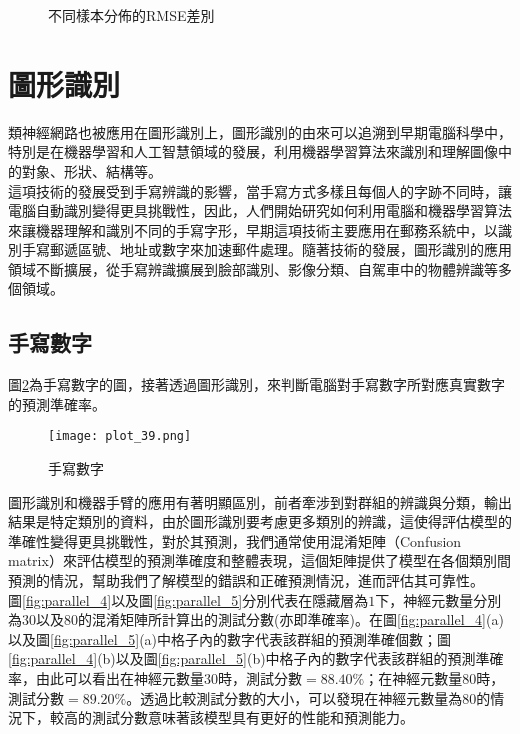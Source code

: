 \documentclass[12pt, a4paper]{article}
\begin{document}
\begin{figure}[H]
\centering
{}
\caption{不同樣本分佈的RMSE差別}
\label{fig:parallel_9}
\end{figure}

\section{圖形識別}
類神經網路也被應用在圖形識別上，圖形識別的由來可以追溯到早期電腦科學中，特別是在機器學習和人工智慧領域的發展，利用機器學習算法來識別和理解圖像中的對象、形狀、結構等。\\
這項技術的發展受到手寫辨識的影響，當手寫方式多樣且每個人的字跡不同時，讓電腦自動識別變得更具挑戰性，因此，人們開始研究如何利用電腦和機器學習算法來讓機器理解和識別不同的手寫字形，早期這項技術主要應用在郵務系統中，以識別手寫郵遞區號、地址或數字來加速郵件處理。隨著技術的發展，圖形識別的應用領域不斷擴展，從手寫辨識擴展到臉部識別、影像分類、自駕車中的物體辨識等多個領域。
\subsection{手寫數字}
圖\;\ref{fig:plot_39.png}\;為手寫數字的圖，接著透過圖形識別，來判斷電腦對手寫數字所對應真實數字的預測準確率。

\begin{figure}[H]
\centering
\texttt{[image: plot\_39.png]}
\caption{手寫數字}
\label{fig:plot_39.png}
\end{figure}


圖形識別和機器手臂的應用有著明顯區別，前者牽涉到對群組的辨識與分類，輸出結果是特定類別的資料，由於圖形識別要考慮更多類別的辨識，這使得評估模型的準確性變得更具挑戰性，對於其預測，我們通常使用混淆矩陣（Confusion matrix）來評估模型的預測準確度和整體表現，這個矩陣提供了模型在各個類別間預測的情況，幫助我們了解模型的錯誤和正確預測情況，進而評估其可靠性。\\
圖\;\ref{fig:parallel_4}\;以及圖\;\ref{fig:parallel_5}\;分別代表在隱藏層為\;$1$\;下，神經元數量分別為\;$30$\;以及\;$80$\;的混淆矩陣所計算出的測試分數(亦即準確率)。在圖\;\ref{fig:parallel_4}\;(a)以及圖\;\ref{fig:parallel_5}\;(a)中格子內的數字代表該群組的預測準確個數；圖\;\ref{fig:parallel_4}\;(b)以及圖\;\ref{fig:parallel_5}\;(b)中格子內的數字代表該群組的預測準確率，由此可以看出在神經元數量\;$30$\;時，測試分數\;$=88.40\%$\;；在神經元數量\;$80$\;時，測試分數\;$=89.20\%$。透過比較測試分數的大小，可以發現在神經元數量為\;$80$\;的情況下，較高的測試分數意味著該模型具有更好的性能和預測能力。
\end{document}

